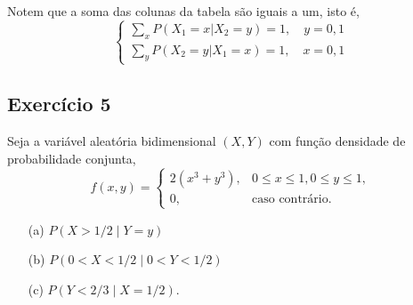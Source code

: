 \documentclass{article}
\begin{document}
Notem que a soma das colunas da tabela são iguais a um, isto é,
    $$
    \left\{
    \begin{array}{l}
    \sum_x P(X_1 = x|X_2 = y) = 1, \quad y = 0, 1 \\
    \sum_y P(X_2 = y|X_1 = x) = 1, \quad x = 0, 1
    \end{array}
    \right.
    $$

\subsection{Exercício 5}
Seja a variável aleatória bidimensional $(X, Y)$ com função densidade de probabilidade conjunta,
    $$
    f(x,y) = 
    \begin{cases}
    2(x^3 + y^3), & 0 \le x \le 1, 0 \le y \le 1,\\
    0, & \text{caso contrário}.
    \end{cases}
    $$

\begin{enumerate}
    \item[(a)] $P(X > 1/2 \mid Y = y)$
    \item[(b)] $P(0 < X < 1/2 \mid 0 < Y < 1/2)$
    \item[(c)] $P(Y < 2/3 \mid X = 1/2)$.
\end{enumerate}
\end{document}
